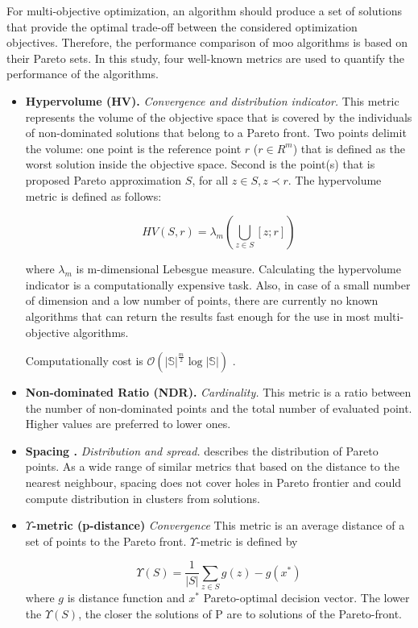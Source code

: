             For multi-objective optimization, an algorithm should produce a set of solutions that provide the optimal trade-off between the considered optimization objectives. Therefore, the performance comparison of \gls{moo} algorithms is based on their Pareto sets. In this study, four well-known metrics are used to quantify the performance of the algorithms.
            \begin{itemize}
                \item \textbf{Hypervolume (HV).}\cite{Zitzler2000ComparisonOM} \textit{Convergence and distribution indicator.}
                This metric represents the volume of the objective space that is covered by the individuals of non-dominated solutions that belong to a Pareto front. Two points delimit the volume: one point is the reference point $r$ ($r \in R^m$) that is defined as the worst solution inside the objective space. Second is the point(s) that is proposed Pareto approximation $S$, for all $z \in S, z \prec r$. The hypervolume metric is defined as follows:

                    \[HV(S,r) = \lambda_m(\bigcup\limits_{z \in S} [z;r])\]

                where $\lambda_m$ is m-dimensional Lebesgue measure.    
                Calculating the hypervolume indicator is a computationally expensive task. Also, in case of a small number of dimension and a low number of points, there are currently no known algorithms that can return the results fast enough for the use in most multi-objective algorithms. 
                
                Computationally cost is $\mathcal{O}(|\mathbb{S}|^{\frac{m}{2}}\log{|\mathbb{S}|}) $ \cite{BeumeFLPV09}.
                \item \textbf{Non-dominated Ratio (NDR).} \textit{Cardinality.} This metric is a ratio between the number of non-dominated points and the total number of evaluated point.  Higher values are preferred to lower ones.
                \item \textbf{Spacing \cite{Schott1995FaultTD}.} \textit{Distribution and spread.} describes the distribution of Pareto points. As a wide range of similar metrics that based on the distance to the nearest neighbour, spacing does not cover holes in Pareto frontier and could compute distribution in clusters from solutions.
                \item \textbf{$\Upsilon$-metric (p-distance)}\cite{Martens13} \textit{Convergence} This metric is an average distance of a set of points to the Pareto front. $\Upsilon$-metric is defined by

                    \[\Upsilon(S) = \frac{1}{|S|}\sum_{z\in S}g(z)-g(x^*)\]
                where $g$ is distance function and $x^*$ Pareto-optimal decision vector.
                The lower the $\Upsilon (S)$, the closer the solutions of P are to solutions of the Pareto-front. 
                
            \end{itemize}
 
